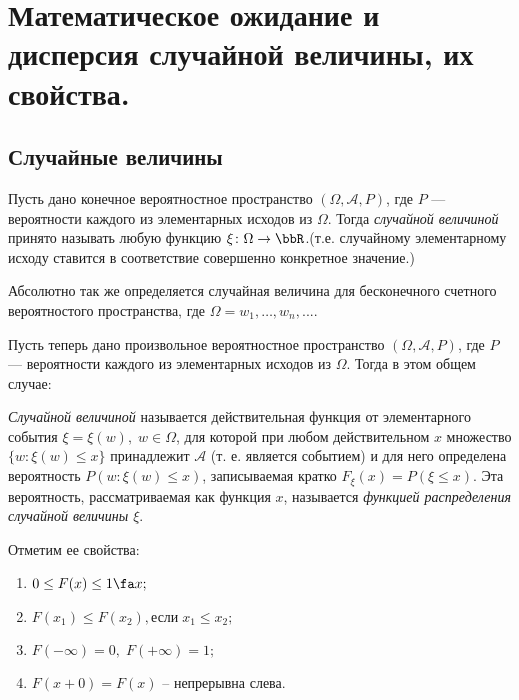 \chapter{Математическое ожидание и дисперсия случайной величины, их свойства.}
\section{Случайные величины}

Пусть дано конечное вероятностное пространство $(\Omega,\mathcal A, P)$, где $P$ --- вероятности каждого из элементарных исходов из $\Omega$. Тогда \textit{случайной величиной} принято называть любую функцию $\xi\colon \Omega \to \bbR$.(т.е. случайному элементарному исходу ставится в соответствие совершенно конкретное значение.)

Абсолютно так же определяется случайная величина для бесконечного счетного вероятностого пространства, где $\Omega = {w_1,\dots, w_n,...}$.

Пусть теперь дано произвольное вероятностное пространство $(\Omega,\mathcal A, P)$, где $P$ --- вероятности каждого из элементарных исходов из $\Omega$. Тогда в этом общем случае:
\begin{defn}
\textit{Случайной величиной} называется действительная функция от элементарного события $\xi = \xi(w), \; w\in\Omega$, для которой при любом действительном $x$ множество $\{w: \xi(w) \le x\}$ принадлежит $\mathcal A$ (т. е. является событием) и для него определена вероятность $P(w: \xi(w) \le x)$, записываемая кратко $F_\xi(x)=P(\xi \le x)$. Эта вероятность, рассматриваемая как функция $x$, называется \textit{функцией распределения случайной величины $\xi$}.
\end{defn}
Отметим ее свойства:
\begin{enumerate}
\item 
$0 \le F(x) \le 1 \fa x;$ 
\item
$F(x_1) \le F(x_2), \text{если}\; x_1\le x_2;$
\item
$F(-\infty)=0, \; F(+\infty)=1;$
\item
$F(x+0)=F(x)$ -- непрерывна слева.
\end{enumerate}


